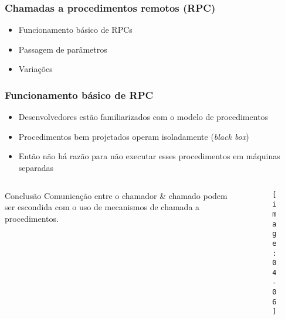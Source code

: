 \documentclass[Ligatures=TeX,table,brazil,svgnames,usetotalslideindicator,compress,10pt]{beamer}
\begin{document}
\begin{frame}
  \frametitle{Chamadas a procedimentos remotos (RPC)}

  \begin{itemize}
  \item Funcionamento básico de RPCs
  \item Passagem de parâmetros
  \item Variações
  \end{itemize}

\end{frame}

\begin{frame}
  \frametitle{Funcionamento básico de RPC}
  \begin{itemize}
  \item Desenvolvedores estão familiarizados com o modelo de procedimentos
  \item Procedimentos bem projetados operam isoladamente (\textit{black box})
  \item Então não há  razão  para não executar esses procedimentos em máquinas separadas
  \end{itemize}

  \begin{columns}
    \begin{column}{0.5\textwidth}
      \begin{alertblock}{Conclusão}
        Comunicação entre o chamador \& chamado podem ser escondida com o uso de mecanismos de chamada a procedimentos.
      \end{alertblock}
    \end{column}
    \begin{column}{0.5\textwidth}
      \begin{figure}[centering]
        \centering
        \texttt{[image: 04-06]}
      \end{figure}
    \end{column}
  \end{columns}

\end{frame}
\end{document}
